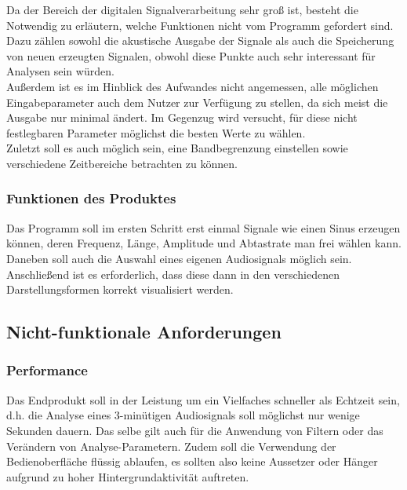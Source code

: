 \documentclass[a4paper]{article}
\begin{document}
Da der Bereich der digitalen Signalverarbeitung sehr groß ist, besteht die Notwendig zu erläutern, welche Funktionen nicht vom Programm gefordert sind. Dazu zählen sowohl die akustische Ausgabe der Signale als auch die Speicherung von neuen erzeugten Signalen, obwohl diese Punkte auch sehr interessant für Analysen sein würden.\\
Außerdem ist es im Hinblick des Aufwandes nicht angemessen, alle möglichen Eingabeparameter auch dem Nutzer zur Verfügung zu stellen, da sich meist die Ausgabe nur minimal ändert. Im Gegenzug wird versucht, für diese nicht festlegbaren Parameter möglichst die besten Werte zu wählen.\\
Zuletzt soll es auch möglich sein, eine Bandbegrenzung einstellen sowie verschiedene Zeitbereiche betrachten zu können.

\subsubsection{Funktionen des Produktes}

Das Programm soll im ersten Schritt erst einmal Signale wie einen Sinus erzeugen können, deren Frequenz, Länge, Amplitude und Abtastrate man frei wählen kann. Daneben soll auch die Auswahl eines eigenen Audiosignals möglich sein.\\
Anschließend ist es erforderlich, dass diese dann in den verschiedenen Darstellungsformen korrekt visualisiert werden.

\subsection{Nicht-funktionale Anforderungen}\label{subsec:nicht-funktionaleAnforderungen}
\subsubsection{Performance}

Das Endprodukt soll in der Leistung um ein Vielfaches schneller als Echtzeit sein, d.h. die Analyse eines 3-minütigen Audiosignals soll möglichst nur wenige Sekunden dauern. Das selbe gilt auch für die Anwendung von Filtern oder das Verändern von Analyse-Parametern. Zudem soll die Verwendung der Bedienoberfläche flüssig ablaufen, es sollten also keine Aussetzer oder Hänger aufgrund zu hoher Hintergrundaktivität auftreten.
\end{document}
